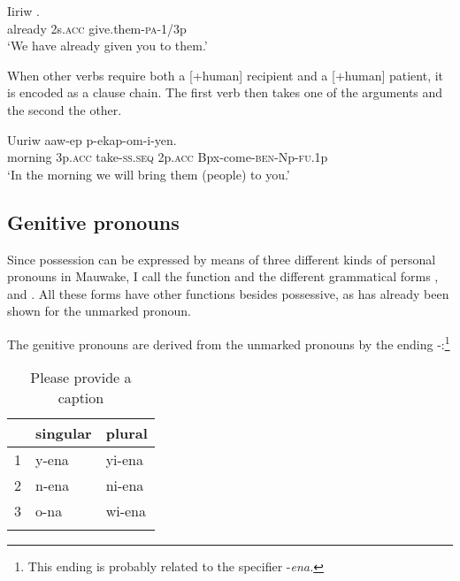 \ea%
\label{ex:3:x565}
\gll Iiriw  . \\
already 2s.\textsc{acc} give.them-\textsc{pa}-1/3p\\
\glt`We have already given you to them.'
\z

When other verbs require both a [+human] recipient and a [+human] patient, it is encoded as a clause chain. The first verb then takes one of the arguments and the second the other.

\ea%
\label{ex:3:x566}
\gll Uuriw  aaw-ep  p-ekap-om-i-yen. \\
morning 3p.\textsc{acc} take-\textsc{ss}.\textsc{seq} 2p.\textsc{acc} Bpx-come-\textsc{ben}-Np-\textsc{fu}.1p\\
\glt`In the morning we will bring them (people) to you.'
\z

\subsection{Genitive pronouns}\label{sec:3:y:x}
{}
Since possession can be expressed by means of three different kinds of personal pronouns in Mauwake, I call the function  and the different grammatical forms , \textstyleDefinedWords{} and . All these forms have other functions besides possessive, as has already been shown for the unmarked pronoun. 

The genitive pronouns are derived from the unmarked pronouns by the ending \nobreakdash-:\footnote{This ending is probably related to the specifier -\textit{ena.}}

\begin{table}
\caption{Please provide a caption}
\label{} 
\begin{tabular}{lll}
\mytoprule
 &singular &plural\\
\midrule
1 &y-ena &yi-ena\\
2 &n-ena &ni-ena\\
3 &o-na &wi-ena\\
\mybottomrule
\end{tabular}
\end{table}


